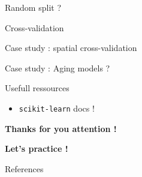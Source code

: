 \documentclass{irdbeamer}
\begin{document}
\begin{frame}{Random split ?}
    
\end{frame}

\begin{frame}{Cross-validation}
    
\end{frame}

\begin{frame}{Case study : spatial cross-validation}
    
\end{frame}

\begin{frame}{Case study : Aging models ?}
    
\end{frame}



\begin{frame}{Usefull ressources}

\begin{itemize}
    \item \texttt{scikit-learn} docs !
\end{itemize}
\end{frame}

\begin{frame}[plain]
    \Huge{\textbf{Thanks for you attention !}}
    
    \vfill
    
    \LARGE{\textbf{Let's practice !}}
\end{frame}

\appendix
\begin{frame}[allowframebreaks]{References}
    {\footnotesize \printbibliography[heading=none]}
\end{frame}
\end{document}
